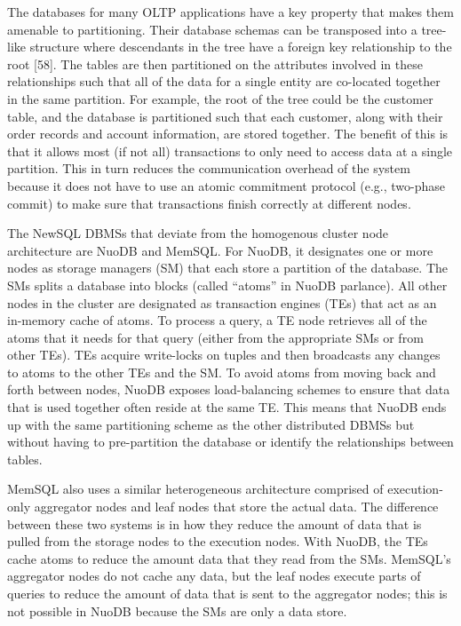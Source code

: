 \documentclass[a4paper,12pt,notitlepage,twoside,openright]{article}
\begin{document}
The databases for many OLTP applications have a key property that makes
them amenable to partitioning. Their database schemas can be transposed
into a tree-like structure where descendants in the tree have a foreign
key relationship to the root {[}58{]}. The tables are then partitioned
on the attributes involved in these relationships such that all of the
data for a single entity are co-located together in the same partition.
For example, the root of the tree could be the customer table, and the
database is partitioned such that each customer, along with their order
records and account information, are stored together. The benefit of
this is that it allows most (if not all) transactions to only need to
access data at a single partition. This in turn reduces the
communication overhead of the system because it does not have to use an
atomic commitment protocol (e.g., two-phase commit) to make sure that
transactions finish correctly at different nodes.

The NewSQL DBMSs that deviate from the homogenous cluster node
architecture are NuoDB and MemSQL. For NuoDB, it designates one or more
nodes as storage managers (SM) that each store a partition of the
database. The SMs splits a database into blocks (called ``atoms'' in
NuoDB parlance). All other nodes in the cluster are designated as
transaction engines (TEs) that act as an in-memory cache of atoms. To
process a query, a TE node retrieves all of the atoms that it needs for
that query (either from the appropriate SMs or from other TEs). TEs
acquire write-locks on tuples and then broadcasts any changes to atoms
to the other TEs and the SM. To avoid atoms from moving back and forth
between nodes, NuoDB exposes load-balancing schemes to ensure that data
that is used together often reside at the same TE. This means that NuoDB
ends up with the same partitioning scheme as the other distributed DBMSs
but without having to pre-partition the database or identify the
relationships between tables.

MemSQL also uses a similar heterogeneous architecture comprised of
execution-only aggregator nodes and leaf nodes that store the actual
data. The difference between these two systems is in how they reduce the
amount of data that is pulled from the storage nodes to the execution
nodes. With NuoDB, the TEs cache atoms to reduce the amount data that
they read from the SMs. MemSQL's aggregator nodes do not cache any data,
but the leaf nodes execute parts of queries to reduce the amount of data
that is sent to the aggregator nodes; this is not possible in NuoDB
because the SMs are only a data store.
\end{document}
